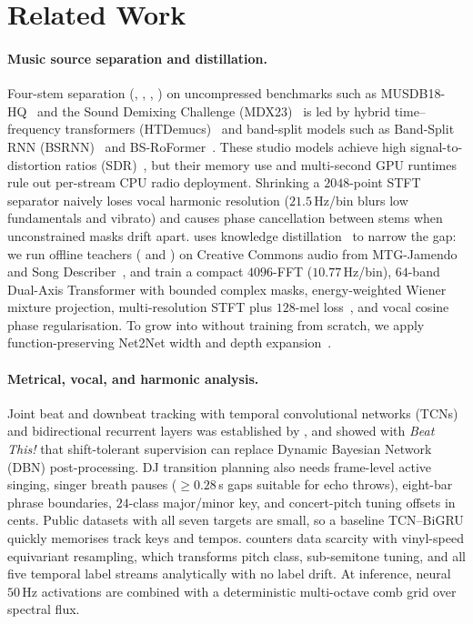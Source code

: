 \section{Related Work}
\label{sec:related}

\paragraph{Music source separation and distillation.}
Four-stem separation (, , , ) on uncompressed benchmarks such as MUSDB18-HQ~\citep{MUSDB18HQ} and the Sound Demixing Challenge (MDX23)~\citep{fabbro2024sdx} is led by hybrid time--frequency transformers (HTDemucs)~\citep{rouard2023hybrid} and band-split models such as Band-Split RNN (BSRNN)~\citep{luo2023music} and BS-RoFormer~\citep{lu2024bsroformer}. These studio models achieve high signal-to-distortion ratios (SDR)~\citep{vincent2006performance}, but their memory use and multi-second GPU runtimes rule out per-stream CPU radio deployment. Shrinking a $2048$-point STFT separator naively loses vocal harmonic resolution ($21.5$\,Hz/bin blurs low fundamentals and vibrato) and causes phase cancellation between stems when unconstrained masks drift apart. \sone{} uses knowledge distillation~\citep{hinton2015distilling} to narrow the gap: we run offline teachers ( and ) on Creative Commons audio from MTG-Jamendo~\citep{bogdanov2019mtg} and Song Describer~\citep{manco2023song}, and train a compact $4096$-FFT ($10.77$\,Hz/bin), $64$-band Dual-Axis Transformer with bounded complex masks, energy-weighted Wiener mixture projection, multi-resolution STFT plus $128$-mel loss~\citep{yamamoto2020parallel}, and vocal cosine phase regularisation. To grow  into  without training from scratch, we apply function-preserving Net2Net width and depth expansion~\citep{chen2016net2net}.

\paragraph{Metrical, vocal, and harmonic analysis.}
Joint beat and downbeat tracking with temporal convolutional networks (TCNs) and bidirectional recurrent layers was established by \citet{bock2020deconstruct}, and \citet{foscarin2024beat} showed with \emph{Beat This!} that shift-tolerant supervision can replace Dynamic Bayesian Network (DBN) post-processing. DJ transition planning also needs frame-level active singing, singer breath pauses ($\ge 0.28$\,s gaps suitable for echo throws), eight-bar phrase boundaries, $24$-class major/minor key, and concert-pitch tuning offsets in cents. Public datasets with all seven targets are small, so a baseline TCN--BiGRU quickly memorises track keys and tempos.  counters data scarcity with vinyl-speed equivariant resampling, which transforms pitch class, sub-semitone tuning, and all five temporal label streams analytically with no label drift. At inference, neural $50$\,Hz activations are combined with a deterministic multi-octave comb grid over spectral flux.

